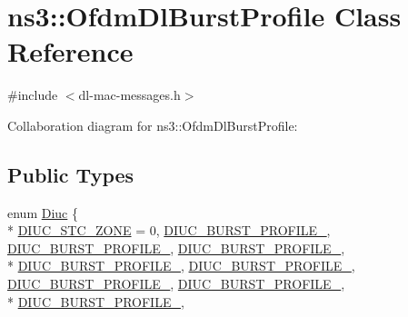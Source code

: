 \hypertarget{classns3_1_1OfdmDlBurstProfile}{}\section{ns3\+:\+:Ofdm\+Dl\+Burst\+Profile Class Reference}
\label{classns3_1_1OfdmDlBurstProfile}


{\ttfamily \#include $<$dl-\/mac-\/messages.\+h$>$}



Collaboration diagram for ns3\+:\+:Ofdm\+Dl\+Burst\+Profile\+:
\subsection*{Public Types}
\begin{DoxyCompactItemize}
\item 
enum \hyperlink{classns3_1_1OfdmDlBurstProfile_a4769c73985bf918ecd21180081471a00}{Diuc} \{ \\*
\hyperlink{classns3_1_1OfdmDlBurstProfile_a4769c73985bf918ecd21180081471a00a59131bd8a95742344deee98da5eb3a8d}{D\+I\+U\+C\+\_\+\+S\+T\+C\+\_\+\+Z\+O\+NE} = 0, 
\hyperlink{classns3_1_1OfdmDlBurstProfile_a4769c73985bf918ecd21180081471a00a7551a9c00acee92830f4d780803de0c0}{D\+I\+U\+C\+\_\+\+B\+U\+R\+S\+T\+\_\+\+P\+R\+O\+F\+I\+L\+E\+\_}, 
\hyperlink{classns3_1_1OfdmDlBurstProfile_a4769c73985bf918ecd21180081471a00a2756c6c80ebc06092e70b31df97cf17c}{D\+I\+U\+C\+\_\+\+B\+U\+R\+S\+T\+\_\+\+P\+R\+O\+F\+I\+L\+E\+\_}, 
\hyperlink{classns3_1_1OfdmDlBurstProfile_a4769c73985bf918ecd21180081471a00aad87c5fff58b218ae86c994a54281a6b}{D\+I\+U\+C\+\_\+\+B\+U\+R\+S\+T\+\_\+\+P\+R\+O\+F\+I\+L\+E\+\_}, 
\\*
\hyperlink{classns3_1_1OfdmDlBurstProfile_a4769c73985bf918ecd21180081471a00a58513ff59a139809481bc1c69096a269}{D\+I\+U\+C\+\_\+\+B\+U\+R\+S\+T\+\_\+\+P\+R\+O\+F\+I\+L\+E\+\_}, 
\hyperlink{classns3_1_1OfdmDlBurstProfile_a4769c73985bf918ecd21180081471a00a383256e577057891279bf2c41eab6751}{D\+I\+U\+C\+\_\+\+B\+U\+R\+S\+T\+\_\+\+P\+R\+O\+F\+I\+L\+E\+\_}, 
\hyperlink{classns3_1_1OfdmDlBurstProfile_a4769c73985bf918ecd21180081471a00a3e37110005eb6471e44cc41d97560779}{D\+I\+U\+C\+\_\+\+B\+U\+R\+S\+T\+\_\+\+P\+R\+O\+F\+I\+L\+E\+\_}, 
\hyperlink{classns3_1_1OfdmDlBurstProfile_a4769c73985bf918ecd21180081471a00af6e115c60f3ea776e07c3e892109b8bb}{D\+I\+U\+C\+\_\+\+B\+U\+R\+S\+T\+\_\+\+P\+R\+O\+F\+I\+L\+E\+\_}, 
\\*
\hyperlink{classns3_1_1OfdmDlBurstProfile_a4769c73985bf918ecd21180081471a00a2708e38e251b1d9e7da98f85745d438a}{D\+I\+U\+C\+\_\+\+B\+U\+R\+S\+T\+\_\+\+P\+R\+O\+F\+I\+L\+E\+\_}, 

\end{DoxyCompactItemize}
